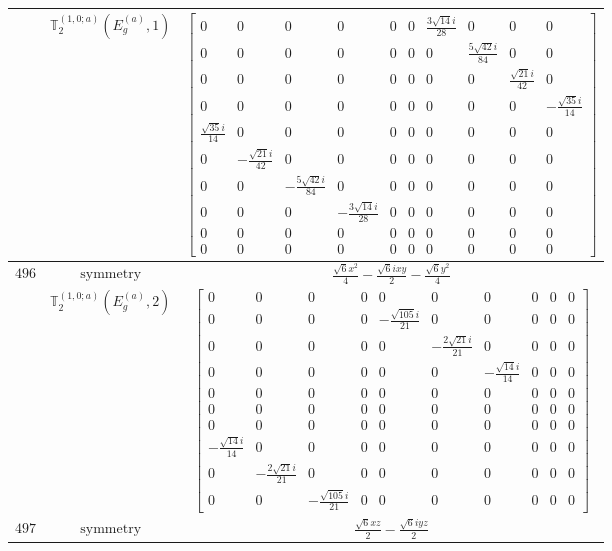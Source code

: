 \documentclass[fleqn,8pt,landscape]{jsarticle}
\begin{document}
\begin{longtable}{ccc}
$  $ & $ \mathbb{T}_{2}^{(1,0;a)}(E_{g}^{(a)},1) $ & $ \begin{bmatrix} 0 & 0 & 0 & 0 & 0 & 0 & \frac{3 \sqrt{14} i}{28} & 0 & 0 & 0 \\ 0 & 0 & 0 & 0 & 0 & 0 & 0 & \frac{5 \sqrt{42} i}{84} & 0 & 0 \\ 0 & 0 & 0 & 0 & 0 & 0 & 0 & 0 & \frac{\sqrt{21} i}{42} & 0 \\ 0 & 0 & 0 & 0 & 0 & 0 & 0 & 0 & 0 & - \frac{\sqrt{35} i}{14} \\ \frac{\sqrt{35} i}{14} & 0 & 0 & 0 & 0 & 0 & 0 & 0 & 0 & 0 \\ 0 & - \frac{\sqrt{21} i}{42} & 0 & 0 & 0 & 0 & 0 & 0 & 0 & 0 \\ 0 & 0 & - \frac{5 \sqrt{42} i}{84} & 0 & 0 & 0 & 0 & 0 & 0 & 0 \\ 0 & 0 & 0 & - \frac{3 \sqrt{14} i}{28} & 0 & 0 & 0 & 0 & 0 & 0 \\ 0 & 0 & 0 & 0 & 0 & 0 & 0 & 0 & 0 & 0 \\ 0 & 0 & 0 & 0 & 0 & 0 & 0 & 0 & 0 & 0 \end{bmatrix} $ \\ \hline
$ 496 $ & $ \text{symmetry} $ & $ \frac{\sqrt{6} x^{2}}{4} - \frac{\sqrt{6} i x y}{2} - \frac{\sqrt{6} y^{2}}{4} $ \\
$  $ & $ \mathbb{T}_{2}^{(1,0;a)}(E_{g}^{(a)},2) $ & $ \begin{bmatrix} 0 & 0 & 0 & 0 & 0 & 0 & 0 & 0 & 0 & 0 \\ 0 & 0 & 0 & 0 & - \frac{\sqrt{105} i}{21} & 0 & 0 & 0 & 0 & 0 \\ 0 & 0 & 0 & 0 & 0 & - \frac{2 \sqrt{21} i}{21} & 0 & 0 & 0 & 0 \\ 0 & 0 & 0 & 0 & 0 & 0 & - \frac{\sqrt{14} i}{14} & 0 & 0 & 0 \\ 0 & 0 & 0 & 0 & 0 & 0 & 0 & 0 & 0 & 0 \\ 0 & 0 & 0 & 0 & 0 & 0 & 0 & 0 & 0 & 0 \\ 0 & 0 & 0 & 0 & 0 & 0 & 0 & 0 & 0 & 0 \\ - \frac{\sqrt{14} i}{14} & 0 & 0 & 0 & 0 & 0 & 0 & 0 & 0 & 0 \\ 0 & - \frac{2 \sqrt{21} i}{21} & 0 & 0 & 0 & 0 & 0 & 0 & 0 & 0 \\ 0 & 0 & - \frac{\sqrt{105} i}{21} & 0 & 0 & 0 & 0 & 0 & 0 & 0 \end{bmatrix} $ \\ \hline
$ 497 $ & $ \text{symmetry} $ & $ \frac{\sqrt{6} x z}{2} - \frac{\sqrt{6} i y z}{2} $ \\

\end{longtable}
\end{document}
